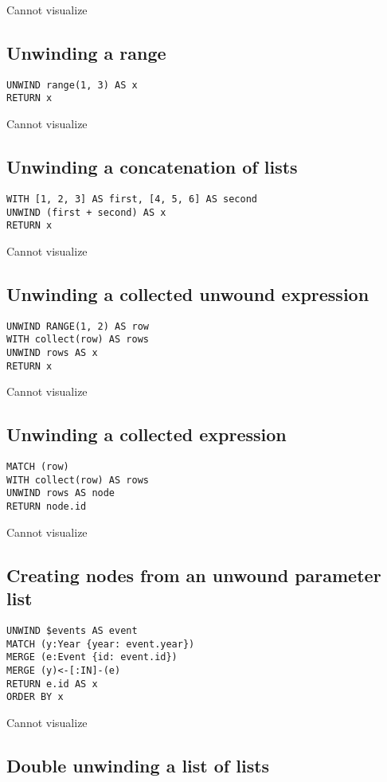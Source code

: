 Cannot visualize
\subsection{Unwinding a range}

\begin{lstlisting}
UNWIND range(1, 3) AS x
RETURN x
\end{lstlisting}

Cannot visualize
\subsection{Unwinding a concatenation of lists}

\begin{lstlisting}
WITH [1, 2, 3] AS first, [4, 5, 6] AS second
UNWIND (first + second) AS x
RETURN x
\end{lstlisting}

Cannot visualize
\subsection{Unwinding a collected unwound expression}

\begin{lstlisting}
UNWIND RANGE(1, 2) AS row
WITH collect(row) AS rows
UNWIND rows AS x
RETURN x
\end{lstlisting}

Cannot visualize
\subsection{Unwinding a collected expression}

\begin{lstlisting}
MATCH (row)
WITH collect(row) AS rows
UNWIND rows AS node
RETURN node.id
\end{lstlisting}

Cannot visualize
\subsection{Creating nodes from an unwound parameter list}

\begin{lstlisting}
UNWIND $events AS event
MATCH (y:Year {year: event.year})
MERGE (e:Event {id: event.id})
MERGE (y)<-[:IN]-(e)
RETURN e.id AS x
ORDER BY x
\end{lstlisting}

Cannot visualize
\subsection{Double unwinding a list of lists}

